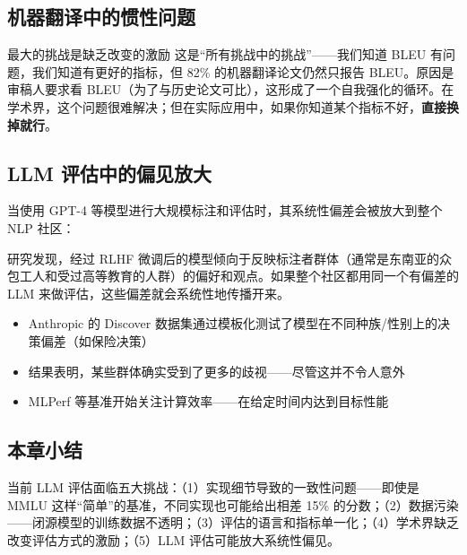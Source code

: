 \documentclass[a4paper]{article}
\begin{document}
\subsection{机器翻译中的惯性问题}





\begin{importantbox}{最大的挑战是缺乏改变的激励}
这是``所有挑战中的挑战''——我们知道 BLEU 有问题，我们知道有更好的指标，但 82\% 的机器翻译论文仍然只报告 BLEU。原因是审稿人要求看 BLEU（为了与历史论文可比），这形成了一个自我强化的循环。在学术界，这个问题很难解决；但在实际应用中，如果你知道某个指标不好，\textbf{直接换掉就行}。
\end{importantbox}

\subsection{LLM 评估中的偏见放大}

当使用 GPT-4 等模型进行大规模标注和评估时，其系统性偏差会被放大到整个 NLP 社区：





研究发现，经过 RLHF 微调后的模型倾向于反映标注者群体（通常是东南亚的众包工人和受过高等教育的人群）的偏好和观点。如果整个社区都用同一个有偏差的 LLM 来做评估，这些偏差就会系统性地传播开来。

\begin{itemize}
    \item Anthropic 的 Discover 数据集通过模板化测试了模型在不同种族/性别上的决策偏差（如保险决策）
    \item 结果表明，某些群体确实受到了更多的歧视——尽管这并不令人意外
    \item MLPerf 等基准开始关注计算效率——在给定时间内达到目标性能
\end{itemize}

\subsection{本章小结}

当前 LLM 评估面临五大挑战：（1）实现细节导致的一致性问题——即使是 MMLU 这样``简单''的基准，不同实现也可能给出相差 15\% 的分数；（2）数据污染——闭源模型的训练数据不透明；（3）评估的语言和指标单一化；（4）学术界缺乏改变评估方式的激励；（5）LLM 评估可能放大系统性偏见。

\end{document}
